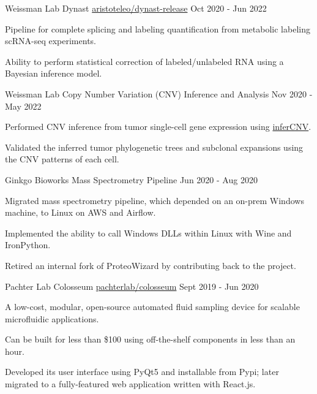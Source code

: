 \begin{cventries}
\cventry
  {Weissman Lab} %
  {Dynast} %
  {\faGithub\phantom{a}\href{https://github.com/aristoteleo/dynast-release}{aristoteleo/dynast-release}} %
  {Oct 2020 - Jun 2022} %
  {
    \begin{cvitems} %
      \item {Pipeline for complete splicing and labeling quantification from metabolic labeling scRNA-seq experiments.}
      \item {Ability to perform statistical correction of labeled/unlabeled RNA using a Bayesian inference model.}
    \end{cvitems}
  }

\cventry
  {Weissman Lab} %
  {Copy Number Variation (CNV) Inference and Analysis} %
  {}
  {Nov 2020 - May 2022}
  {
    \begin{cvitems} %
      \item {Performed CNV inference from tumor single-cell gene expression using \href{https://github.com/broadinstitute/infercnv}{inferCNV}.}
      \item {Validated the inferred tumor phylogenetic trees and subclonal expansions using the CNV patterns of each cell.}
    \end{cvitems}
  }

\cventry
  {Ginkgo Bioworks} %
  {Mass Spectrometry Pipeline} %
  {} %
  {Jun 2020 - Aug 2020} %
  {
    \begin{cvitems} %
      \item {Migrated mass spectrometry pipeline, which depended on an on-prem Windows machine, to Linux on AWS and Airflow.}
      \item {Implemented the ability to call Windows DLLs within Linux with Wine and IronPython.}
      \item {Retired an internal fork of ProteoWizard by contributing back to the project.}
    \end{cvitems}
  }

\cventry
  {Pachter Lab} %
  {Colosseum} %
  {\faGithub\phantom{a}\href{https://github.com/pachterlab/colosseum}{pachterlab/colosseum}} %
  {Sept 2019 - Jun 2020} %
  {
    \begin{cvitems} %
      \item {A low-cost, modular, open-source automated fluid sampling device for scalable microfluidic applications.}
      \item {Can be built for less than \$100 using off-the-shelf components in less than an hour.}
      \item {Developed its user interface using PyQt5 and installable from Pypi; later migrated to a fully-featured web application written with React.js.}
    \end{cvitems}
  }


\end{cventries}
